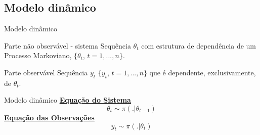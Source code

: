 \documentclass{beamer}
\begin{document}
\subsection*{Modelo dinâmico}
\begin{frame}{Modelo dinâmico}
\noindent

 
  \begin{block}{Parte não observável - sistema}
  {\large Sequência $\theta_t$ com estrutura de dependência de um Processo Markoviano, $\{\theta_t$, $t=1,...,n\}$.}
\end{block}

\pause
  \begin{block}{Parte observável}
  {\large Sequência $y_t$ $\{y_t$, $t=1,...,n\}$ que é dependente, exclusivamente, de $\theta_t$.}
\end{block}
  

\end{frame}


\begin{frame}{Modelo dinâmico}
\pause
\underline{\textbf{Equação do Sistema}}
$$
\theta_t \sim \pi(.|\theta_{t-1})
$$
\pause
\underline{\textbf{Equação das Observações}}
$$
y_t \sim \pi(.|\theta_{t})
$$

\end{frame}
\end{document}
